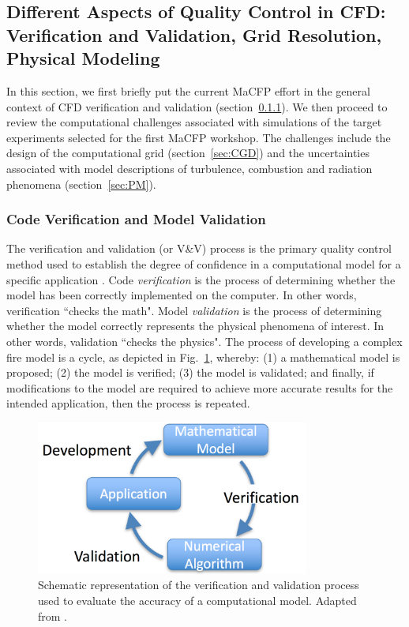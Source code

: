 
\subsection{Different Aspects of Quality Control in CFD: Verification and Validation, Grid Resolution, Physical Modeling} \label{sec:cfd_review}

In this section, we first briefly put the current MaCFP effort in the general context of CFD verification and validation (section~\ref{sec:CVMV}). We then proceed to review the computational challenges associated with simulations of the target experiments selected for the first MaCFP workshop. The challenges include the design of the computational grid (section~\ref{sec:CGD}) and the uncertainties associated with model descriptions of turbulence, combustion and radiation phenomena (section~\ref{sec:PM}).

\subsubsection{Code Verification and Model Validation}
\label{sec:CVMV}

The verification and validation (or V\&V) process is the primary quality control method used to establish the degree of confidence in a computational model for a specific application \cite{ASTM:E1355,Roache:1998,Oberkampf:2006,Oberkampf:2010,McGrattan:2011,FDS_Verification_Guide,FDS_Validation_Guide}. Code \emph{verification} is the process of determining whether the model has been correctly implemented on the computer. In other words, verification ``checks the math".  Model \emph{validation} is the process of determining whether the model correctly represents the physical phenomena of interest. In other words, validation ``checks the physics".  The process of developing a complex fire model is a cycle, as depicted in Fig.~\ref{fig:vv_cycle}, whereby: (1) a mathematical model is proposed; (2) the model is verified; (3) the model is validated; and finally, if modifications to the model are required to achieve more accurate results for the intended application, then the process is repeated.

\begin{figure}
\centering
\includegraphics[height=2in]{Figures/vv_cycle.png}
\caption{Schematic representation of the verification and validation process used to evaluate the accuracy of a computational model. Adapted from \cite{Oberkampf:2010}.}
\label{fig:vv_cycle}
\end{figure}

